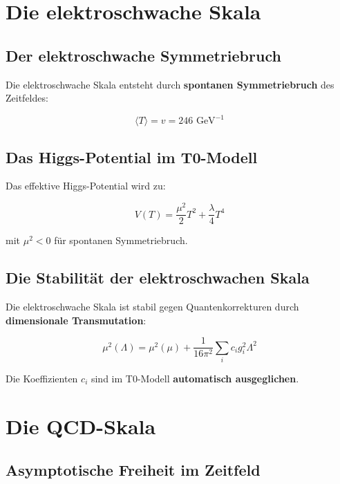 \documentclass[12pt,a4paper]{report}
\begin{document}
	\section{Die elektroschwache Skala}
	
	\subsection{Der elektroschwache Symmetriebruch}
	
	Die elektroschwache Skala entsteht durch \textbf{spontanen Symmetriebruch} des Zeitfeldes:
	
	\begin{equation}
		\langle T\rangle = v = 246 \text{ GeV}^{-1}
	\end{equation}
	
	\subsection{Das Higgs-Potential im T0-Modell}
	
	Das effektive Higgs-Potential wird zu:
	
	\begin{equation}
		V(T) = \frac{\mu^2}{2}T^2 + \frac{\lambda}{4}T^4
	\end{equation}
	
	mit $\mu^2 < 0$ für spontanen Symmetriebruch.
	
	\subsection{Die Stabilität der elektroschwachen Skala}
	
	Die elektroschwache Skala ist stabil gegen Quantenkorrekturen durch \textbf{dimensionale Transmutation}:
	
	\begin{equation}
		\mu^2(\Lambda) = \mu^2(\mu) + \frac{1}{16\pi^2}\sum_i c_i g_i^2 \Lambda^2
	\end{equation}
	
	Die Koeffizienten $c_i$ sind im T0-Modell \textbf{automatisch ausgeglichen}.
	
	\section{Die QCD-Skala}
	
	\subsection{Asymptotische Freiheit im Zeitfeld}
	
\end{document}
